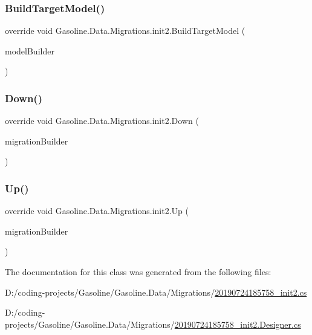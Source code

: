 \subsubsection{\texorpdfstring{BuildTargetModel()}{BuildTargetModel()}}
{\footnotesize\ttfamily override void Gasoline.\+Data.\+Migrations.\+init2.\+Build\+Target\+Model (\begin{DoxyParamCaption}\item[{Model\+Builder}]{model\+Builder }\end{DoxyParamCaption})\hspace{0.3cm}{\ttfamily [protected]}}

\mbox{\label{class_gasoline_1_1_data_1_1_migrations_1_1init2_a6c61ee50816e7bf803a0212f378c51d3}} 
\subsubsection{\texorpdfstring{Down()}{Down()}}
{\footnotesize\ttfamily override void Gasoline.\+Data.\+Migrations.\+init2.\+Down (\begin{DoxyParamCaption}\item[{Migration\+Builder}]{migration\+Builder }\end{DoxyParamCaption})\hspace{0.3cm}{\ttfamily [protected]}}

\mbox{\label{class_gasoline_1_1_data_1_1_migrations_1_1init2_a34ad66548e8e251cc6cd5c8be2a7c3c7}} 
\subsubsection{\texorpdfstring{Up()}{Up()}}
{\footnotesize\ttfamily override void Gasoline.\+Data.\+Migrations.\+init2.\+Up (\begin{DoxyParamCaption}\item[{Migration\+Builder}]{migration\+Builder }\end{DoxyParamCaption})\hspace{0.3cm}{\ttfamily [protected]}}



The documentation for this class was generated from the following files\+:\begin{DoxyCompactItemize}
\item 
D\+:/coding-\/projects/\+Gasoline/\+Gasoline.\+Data/\+Migrations/\mbox{\hyperlink{20190724185758__init2_8cs}{20190724185758\+\_\+init2.\+cs}}\item 
D\+:/coding-\/projects/\+Gasoline/\+Gasoline.\+Data/\+Migrations/\mbox{\hyperlink{20190724185758__init2_8_designer_8cs}{20190724185758\+\_\+init2.\+Designer.\+cs}}\end{DoxyCompactItemize}
